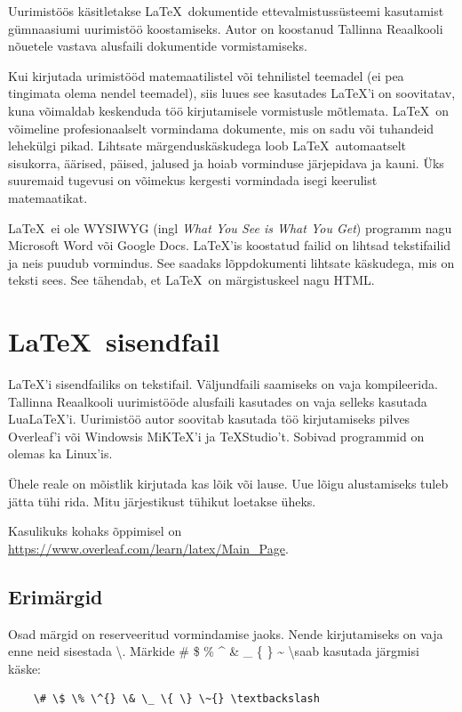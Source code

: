 \documentclass{trkut}%
\begin{document}
\maketitle%
\tableofcontents%

\nummerdame%

Uurimistöös käsitletakse \LaTeX \ dokumentide ettevalmistussüsteemi kasutamist gümnaasiumi uurimistöö koostamiseks. Autor on koostanud Tallinna Reaalkooli nõuetele vastava alusfaili dokumentide vormistamiseks. 

Kui kirjutada urimistööd matemaatilistel või tehnilistel teemadel (ei pea tingimata olema nendel teemadel), siis luues see kasutades \LaTeX'i on soovitatav, kuna võimaldab keskenduda töö kirjutamisele vormistusle mõtlemata. \LaTeX \ on võimeline profesionaalselt vormindama dokumente, mis on sadu või tuhandeid lehekülgi pikad. Lihtsate märgenduskäskudega loob \LaTeX \ automaatselt sisukorra, äärised, päised, jalused ja hoiab vorminduse järjepidava ja kauni. Üks suuremaid tugevusi on võimekus kergesti vormindada isegi keerulist matemaatikat.

\LaTeX \ ei ole \textsc{WYSIWYG} (ingl \textit{What You See is What You Get}) programm nagu Microsoft Word või Google Docs. \LaTeX'is koostatud failid on lihtsad tekstifailid ja neis puudub vormindus. See saadaks lõppdokumenti lihtsate käskudega, mis on teksti sees. See tähendab, et \LaTeX \ on märgistuskeel nagu HTML.

\chapter{\LaTeX \ sisendfail}
\LaTeX'i sisendfailiks on tekstifail. Väljundfaili saamiseks on vaja kompileerida. Tallinna Reaalkooli uurimistööde alusfaili kasutades on vaja selleks kasutada LuaLaTeX'i. Uurimistöö autor soovitab kasutada töö kirjutamiseks pilves Overleaf'i või Windowsis MiKTeX'i ja TeXStudio't. Sobivad programmid on olemas ka Linux'is.

Ühele reale on mõistlik kirjutada kas lõik või lause. Uue lõigu alustamiseks tuleb jätta tühi rida. Mitu järjestikust tühikut loetakse üheks.

Kasulikuks kohaks õppimisel on \url{https://www.overleaf.com/learn/latex/Main_Page}.

\section{Erimärgid}
Osad märgid on reserveeritud vormindamise jaoks. Nende kirjutamiseks on vaja enne neid sisestada \textbackslash. Märkide \# \$ \% \^{} \& \_ \{ \} \~{} \textbackslash saab kasutada järgmisi käske:
\begin{verbatim}
    \# \$ \% \^{} \& \_ \{ \} \~{} \textbackslash 
\end{verbatim}
\end{document}
